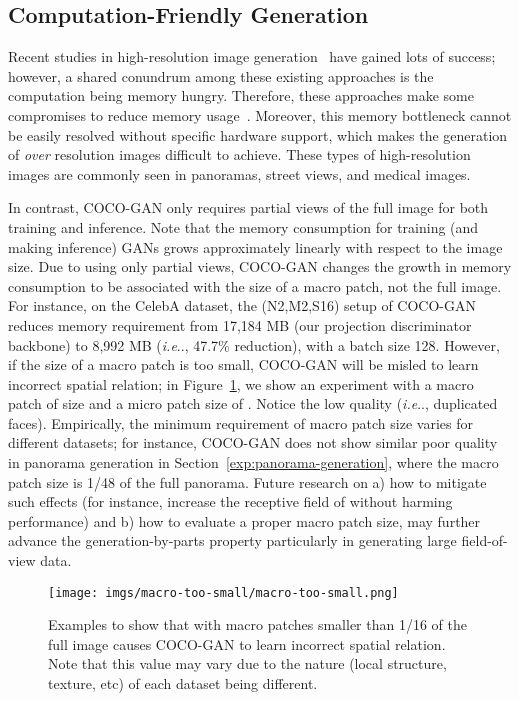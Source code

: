 \documentclass{article}
\makeatletter
\newcommand{\modelName}{COCO-GAN }
\DeclareRobustCommand\onedot{\futurelet\@let@token\@onedot}
\def\@onedot{\ifx\@let@token.\else.\null\fi\xspace}
\def\ie{\emph{i.e}\onedot} \def\Ie{\emph{I.e}\onedot}
\makeatother
\begin{document}
    \subsection{Computation-Friendly Generation}
    
        Recent studies in high-resolution image generation~\cite{PGGAN, R1-regularizer,intro-vae} have gained lots of success; however, a shared conundrum among these existing approaches is the computation being memory hungry. Therefore, these approaches make some compromises to reduce memory usage~\cite{PGGAN,R1-regularizer}. Moreover, this memory bottleneck cannot be easily resolved without specific hardware support, which makes the generation of \textit{over}  resolution images difficult to achieve. These types of high-resolution images are commonly seen in panoramas, street views, and medical images. 
    
        In contrast, \modelName only requires partial views of the full image for both training and inference. Note that the memory consumption for training (and making inference) GANs grows approximately linearly with respect to the image size. Due to using only partial views, \modelName changes the growth in memory consumption to be associated with the size of a macro patch, not the full image. For instance, on the CelebA  dataset, the (N2,M2,S16) setup of \modelName reduces memory requirement from 17,184 MB (our projection discriminator backbone) to 8,992 MB (\ie, 47.7\% reduction), with a batch size 128. However, if the size of a macro patch is too small, \modelName will be misled to learn incorrect spatial relation; in Figure~\ref{fig:macro-too-small}, we show an experiment with a macro patch of size  and a micro patch size of . Notice the low quality (\ie, duplicated faces). Empirically, the minimum requirement of macro patch size varies for different datasets; for instance, \modelName does not show similar poor quality in panorama generation in Section~\ref{exp:panorama-generation}, where the macro patch size is 1/48 of the full panorama. Future research on a) how to mitigate such effects (for instance, increase the receptive field of  without harming performance) and b) how to evaluate a proper macro patch size, may further advance the generation-by-parts property particularly in generating large field-of-view data.
        
        \begin{figure}[h]
            \centering
            \texttt{[image: imgs/macro-too-small/macro-too-small.png]}
            \caption{Examples to show that with macro patches smaller than 1/16 of the full image causes \modelName to learn incorrect spatial relation. Note that this value may vary due to the nature (local structure, texture, etc) of each dataset being different.}
            \label{fig:macro-too-small}
\end{figure}
        
\end{document}
